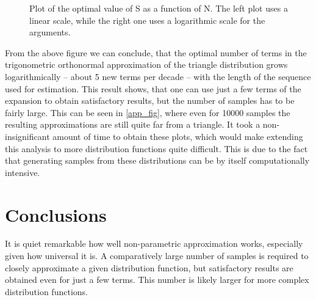 \begin{figure}[h!]
\begin{center}

\caption{Plot of the optimal value of S as a function of N. The left plot uses a linear scale, while the right one uses a logarithmic scale for the arguments.}
\end{center}
\end{figure}

From the above figure we can conclude, that the optimal number of terms in the trigonometric orthonormal approximation of the triangle distribution grows logarithmically -- about 5 new terms per decade -- with the length of the sequence used for estimation. This result shows, that one can use just a few terms of the expansion to obtain satisfactory results, but the number of samples has to be fairly large. This can be seen in \ref{app_fig}, where even for 10000 samples the resulting approximations are still quite far from a triangle. It took a non-insignificant amount of time to obtain these plots, which would make extending this analysis to more distribution functions quite difficult. This is due to the fact that generating samples from these distributions can be by itself computationally intensive.

\section{Conclusions}
It is quiet remarkable how well non-parametric approximation works, especially given how universal it is. A comparatively large number of samples is required to closely approximate a given distribution function, but satisfactory results are obtained even for just a few terms. This number is likely larger for more complex distribution functions.
